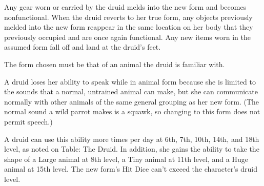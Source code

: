 Any gear worn or carried by the druid melds into the new form and becomes nonfunctional. When the druid reverts to her true form, any objects previously melded into the new form reappear in the same location on her body that they previously occupied and are once again functional. Any new items worn in the assumed form fall off and land at the druid's feet.

The form chosen must be that of an animal the druid is familiar with.

A druid loses her ability to speak while in animal form because she is limited to the sounds that a normal, untrained animal can make, but she can communicate normally with other animals of the same general grouping as her new form. (The normal sound a wild parrot makes is a squawk, so changing to this form does not permit speech.)

A druid can use this ability more times per day at 6th, 7th, 10th, 14th, and 18th level, as noted on Table: The Druid. In addition, she gains the ability to take the shape of a Large animal at 8th level, a Tiny animal at 11th level, and a Huge animal at 15th level. The new form's Hit Dice can't exceed the character's druid level.


